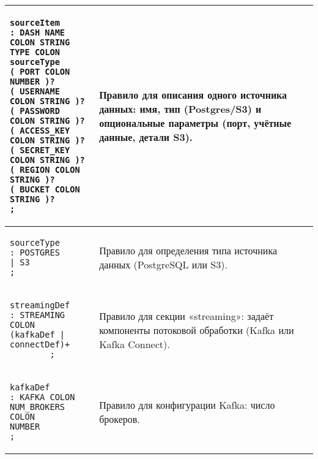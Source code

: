 \begin{longtable}{|p{3in}|p{3in}|}
    \begin{minipage}{3in}
        \begin{verbatim}
sourceItem
: DASH NAME COLON STRING 
TYPE COLON sourceType
( PORT COLON NUMBER )?
( USERNAME COLON STRING )?
( PASSWORD COLON STRING )?
( ACCESS_KEY COLON STRING )?
( SECRET_KEY COLON STRING )?
( REGION COLON STRING )?
( BUCKET COLON STRING )?
;
    \end{verbatim}
    \end{minipage}
                                 &
    \begin{minipage}{2.6in}
        Правило для описания одного источника данных: имя, тип (Postgres/S3) и опциональные параметры (порт, учётные данные, детали S3).
    \end{minipage}
    \\ \hline

    \begin{minipage}{3in}
        \begin{verbatim}
sourceType
: POSTGRES
| S3
;
    \end{verbatim}
    \end{minipage}
                                 &
    \begin{minipage}{2.6in}
        Правило для определения типа источника данных (PostgreSQL или S3).
    \end{minipage}
    \\ \hline

    \begin{minipage}{3in}
        \begin{verbatim}
streamingDef
: STREAMING COLON 
(kafkaDef | connectDef)+
        ;
    \end{verbatim}
    \end{minipage}
                                 &
    \begin{minipage}{2.6in}
        Правило для секции «streaming»: задаёт компоненты потоковой обработки (Kafka или Kafka Connect).
    \end{minipage}
    \\ \hline

    \begin{minipage}{3in}
        \begin{verbatim}
kafkaDef
: KAFKA COLON 
NUM_BROKERS COLON 
NUMBER
;
    \end{verbatim}
    \end{minipage}
                                 &
    \begin{minipage}{2.6in}
        Правило для конфигурации Kafka: число брокеров.
    \end{minipage}
    \\ \hline


\end{longtable}
